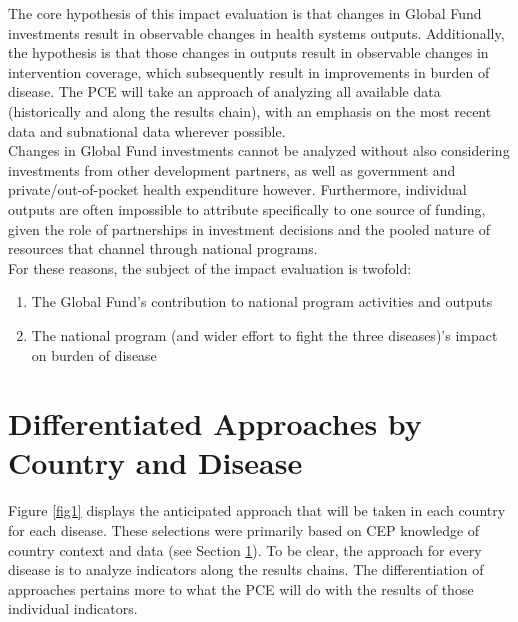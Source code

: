 \documentclass[twocolumn]{bmcart}%
\begin{document}
The core hypothesis of this impact evaluation is that changes in Global Fund investments result in observable changes in health systems outputs. Additionally, the hypothesis is that those changes in outputs result in observable changes in intervention coverage, which subsequently result in improvements in burden of disease. The PCE will take an approach of analyzing all available data (historically and along the results chain), with an emphasis on the most recent data and subnational data wherever possible. \\

Changes in Global Fund investments cannot be analyzed without also considering investments from other development partners, as well as government and private/out-of-pocket health expenditure however. Furthermore, individual outputs are often impossible to attribute specifically to one source of funding, given the role of partnerships in investment decisions and the pooled nature of resources that channel through national programs. \\

For these reasons, the subject of the impact evaluation is twofold:
\begin{enumerate}
  \item The Global Fund's contribution to national program activities and outputs
  \item The national program (and wider effort to fight the three diseases)'s impact on burden of disease
\end{enumerate}


\section{Differentiated Approaches by Country and Disease} \label{why}

Figure \ref{fig1} displays the anticipated approach that will be taken in each country for each disease. These selections were primarily based on CEP knowledge of country context and data (see Section \ref{why}). To be clear, the approach for every disease is to analyze indicators along the results chains. The differentiation of approaches pertains more to what the PCE will do with the results of those individual indicators. \\
\end{document}
